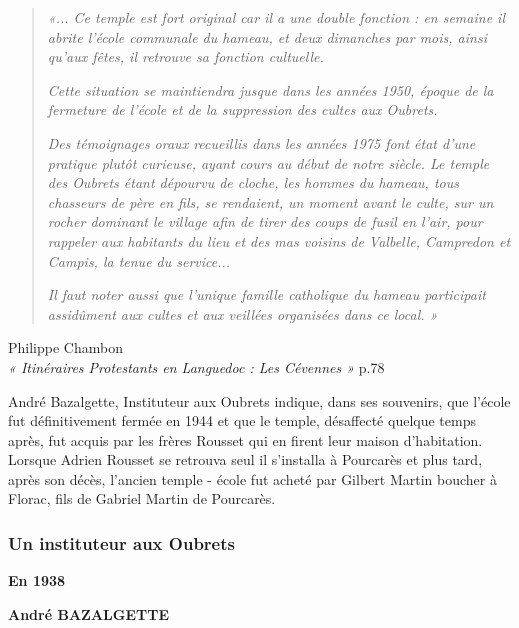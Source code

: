 \begin{quote}
\textit{«... Ce temple est fort original car il a une double fonction : en semaine il
abrite l’école communale du hameau, et deux dimanches par mois, ainsi qu’aux fêtes,
il retrouve sa fonction cultuelle.}

\textit{Cette situation se maintiendra jusque dans les années 1950, époque de la fermeture
de l’école et de la suppression des cultes aux Oubrets.}

\textit{Des témoignages oraux recueillis dans les années 1975 font état d’une pratique
plutôt curieuse, ayant cours au début de notre siècle. Le temple des Oubrets étant
dépourvu de cloche, les hommes du hameau, tous chasseurs de père en fils, se
rendaient, un moment avant le culte, sur un rocher dominant le village afin de tirer
des coups de fusil en l’air, pour rappeler aux habitants du lieu et des mas voisins de
Valbelle, Campredon et Campis, la tenue du service...}

\textit{Il faut noter aussi que l’unique famille catholique du hameau participait assidûment
aux cultes et aux veillées organisées dans ce local. »}
\end{quote}

\begin{flushright}
Philippe Chambon\\
\textit{« Itinéraires Protestants en Languedoc : Les Cévennes »} p.78
\end{flushright}

André Bazalgette, Instituteur aux Oubrets indique, dans ses souvenirs, que l’école fut
définitivement fermée en 1944 et que le temple, désaffecté quelque temps après, fut acquis
par les frères Rousset qui en firent leur maison d’habitation. Lorsque Adrien Rousset se
retrouva seul il s’installa à Pourcarès et plus tard, après son décès, l’ancien temple - école fut
acheté par Gilbert Martin boucher à Florac, fils de Gabriel Martin de Pourcarès.



\subsubsection{Un instituteur aux Oubrets}

\begin{center}

\vspace{1cm}

{\Large\bfseries En 1938}

\vfill

\begin{flushright}
\textbf{André BAZALGETTE}
\end{flushright}

\end{center}

